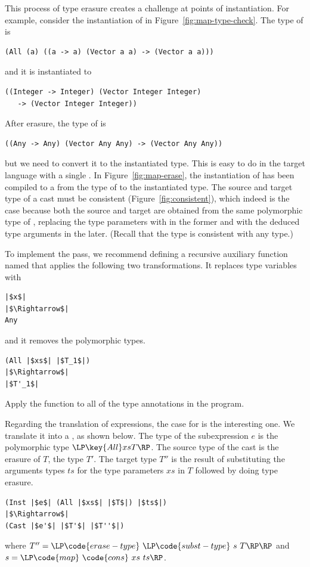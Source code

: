 \documentclass[7x10]{TimesAPriori_MIT}%
\begin{document}
This process of type erasure creates a challenge at points of
instantiation. For example, consider the instantiation of
 in Figure~\ref{fig:map-type-check}.
The type of  is
\begin{lstlisting}
(All (a) ((a -> a) (Vector a a) -> (Vector a a)))
\end{lstlisting}
and it is instantiated to 
\begin{lstlisting}
((Integer -> Integer) (Vector Integer Integer)
   -> (Vector Integer Integer))
\end{lstlisting}
After erasure, the type of  is
\begin{lstlisting}
((Any -> Any) (Vector Any Any) -> (Vector Any Any))
\end{lstlisting}
but we need to convert it to the instantiated type.  This is easy to
do in the target language \LangCast{} with a single .  In
Figure~\ref{fig:map-erase}, the instantiation of 
has been compiled to a  from the type of  to
the instantiated type. The source and target type of a cast must be
consistent (Figure~\ref{fig:consistent}), which indeed is the case
because both the source and target are obtained from the same
polymorphic type of , replacing the type parameters with
 in the former and with the deduced type arguments in the
later. (Recall that the  type is consistent with any type.)

To implement the  pass, we recommend defining a
recursive auxiliary function named  that applies the
following two transformations. It replaces type variables with
\begin{lstlisting}
|$x$|
|$\Rightarrow$|
Any
\end{lstlisting}
and it removes the polymorphic  types.
\begin{lstlisting}
(All |$xs$| |$T_1$|)
|$\Rightarrow$|
|$T'_1$|
\end{lstlisting}
Apply the  function to all of the type annotations in
the program.

Regarding the translation of expressions, the case for  is
the interesting one. We translate it into a , as shown
below. The type of the subexpression $e$ is the polymorphic type
$\LP\key{All} xs T\RP$. The source type of the cast is the erasure of
$T$, the type $T'$. The target type $T''$ is the result of
substituting the arguments types $ts$ for the type parameters $xs$ in
$T$ followed by doing type erasure.
\begin{lstlisting}
(Inst |$e$| (All |$xs$| |$T$|) |$ts$|)
|$\Rightarrow$|
(Cast |$e'$| |$T'$| |$T''$|)
\end{lstlisting}
where $T'' = \LP\code{erase-type}~\LP\code{subst-type}~s~T\RP\RP$
and $s = \LP\code{map}~\code{cons}~xs~ts\RP$.
\end{document}
